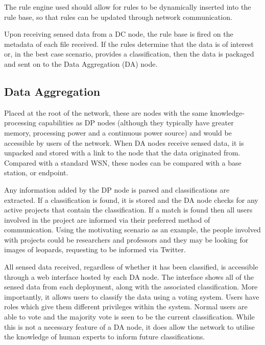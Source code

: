 	The rule engine used should allow for rules to be dynamically inserted into the rule base, so that rules can be updated through network communication.

	Upon receiving sensed data from a DC node, the rule base is fired on the metadata of each file received. If the rules determine that the data is of interest or, in the best case scenario, provides a classification, then the data is packaged and sent on to the Data Aggregation (DA) node.
	
	\subsection{Data Aggregation}
	Placed at the root of the network, these are nodes with the same knowledge-processing capabilities as DP nodes (although they typically have greater memory, processing power and a continuous power source) and would be accessible by users of the network. When DA nodes receive sensed data, it is unpacked and stored with a link to the node that the data originated from. Compared with a standard WSN, these nodes can be compared with a base station, or endpoint.
	
	Any information added by the DP node is parsed and classifications are extracted. If a classification is found, it is stored and the DA node checks for any active projects that contain the classification. If a match is found then all users involved in the project are informed via their preferred method of communication. Using the motivating scenario as an example, the people involved with projects could be researchers and professors and they may be looking for images of leopards, requesting to be informed via Twitter.
	
	All sensed data received, regardless of whether it has been classified, is accessible through a web interface hosted by each DA node. The interface shows all of the sensed data from each deployment, along with the associated classification. More importantly, it allows users to classify the data using a voting system. Users have roles which give them different privileges within the system. Normal users are able to vote and the majority vote is seen to be the current classification. While this is not a necessary feature of a DA node, it does allow the network to utilise the knowledge of human experts to inform future classifications.
	
